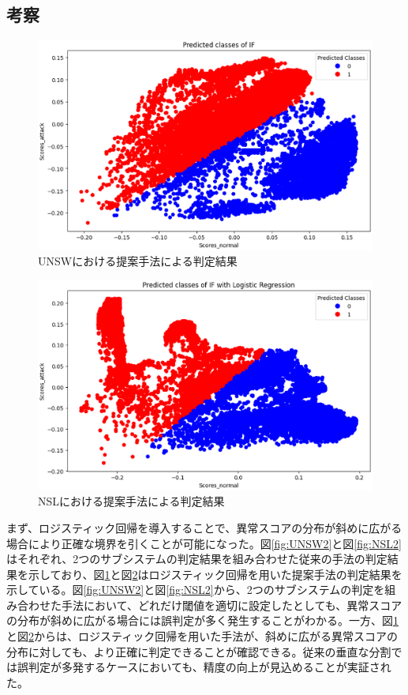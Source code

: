 \documentclass{css}
\begin{document}
\subsection{考察}

\begin{figure}[ht]
    \centering
    \includegraphics[width=\linewidth]{pictures/eps/UNSW3.eps}
    \caption{UNSWにおける提案手法による判定結果}
    \label{fig:UNSW3}
\end{figure}

\begin{figure}[ht]
    \centering
    \includegraphics[width=\linewidth]{pictures/eps/NSL3.eps}
    \caption{NSLにおける提案手法による判定結果}
    \label{fig:NSL3}
\end{figure}

まず、ロジスティック回帰を導入することで、異常スコアの分布が斜めに広がる場合により正確な境界を引くことが可能になった。図\ref{fig:UNSW2}と図\ref{fig:NSL2}はそれぞれ、2つのサブシステムの判定結果を組み合わせた従来の手法の判定結果を示しており、図\ref{fig:UNSW3}と図\ref{fig:NSL3}はロジスティック回帰を用いた提案手法の判定結果を示している。図\ref{fig:UNSW2}と図\ref{fig:NSL2}から、2つのサブシステムの判定を組み合わせた手法において、どれだけ閾値を適切に設定したとしても、異常スコアの分布が斜めに広がる場合には誤判定が多く発生することがわかる。一方、図\ref{fig:UNSW3}と図\ref{fig:NSL3}からは、ロジスティック回帰を用いた手法が、斜めに広がる異常スコアの分布に対しても、より正確に判定できることが確認できる。従来の垂直な分割では誤判定が多発するケースにおいても、精度の向上が見込めることが実証された。
\end{document}
